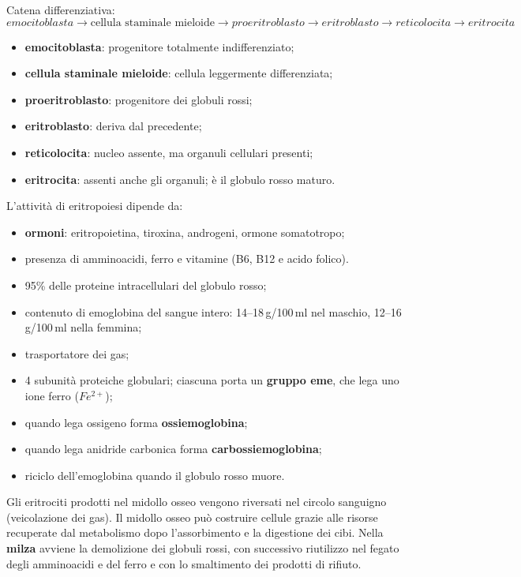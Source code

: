 Catena differenziativa:
$$emocitoblasta \rightarrow \text{cellula staminale mieloide} \rightarrow proeritroblasto \rightarrow eritroblasto \rightarrow reticolocita \rightarrow eritrocita$$
\begin{itemize}
  \item \textbf{emocitoblasta}: progenitore totalmente indifferenziato;
  \item \textbf{cellula staminale mieloide}: cellula leggermente differenziata;
  \item \textbf{proeritroblasto}: progenitore dei globuli rossi;
  \item \textbf{eritroblasto}: deriva dal precedente;
  \item \textbf{reticolocita}: nucleo assente, ma organuli cellulari presenti;
  \item \textbf{eritrocita}: assenti anche gli organuli; è il globulo rosso maturo.
\end{itemize}
L'attività di eritropoiesi dipende da:
\begin{itemize}
  \item \textbf{ormoni}: eritropoietina, tiroxina, androgeni, ormone somatotropo;
  \item presenza di amminoacidi, ferro e vitamine (B6, B12 e acido folico).
\end{itemize}

\begin{itemize}
  \item 95\% delle proteine intracellulari del globulo rosso;
  \item contenuto di emoglobina del sangue intero: 14--18\,g/100\,ml nel maschio, 12--16\,g/100\,ml nella femmina;
  \item trasportatore dei gas;
  \item 4 subunità proteiche globulari; ciascuna porta un \textbf{gruppo eme}, che lega uno ione ferro ($Fe^{2+}$);
  \item quando lega ossigeno forma \textbf{ossiemoglobina};
  \item quando lega anidride carbonica forma \textbf{carbossiemoglobina};
  \item riciclo dell'emoglobina quando il globulo rosso muore.
\end{itemize}

Gli eritrociti prodotti nel midollo osseo vengono riversati nel circolo sanguigno (veicolazione dei gas). Il midollo osseo può costruire cellule grazie alle risorse recuperate dal metabolismo dopo l'assorbimento e la digestione dei cibi. Nella \textbf{milza} avviene la demolizione dei globuli rossi, con successivo riutilizzo nel fegato degli amminoacidi e del ferro e con lo smaltimento dei prodotti di rifiuto.

